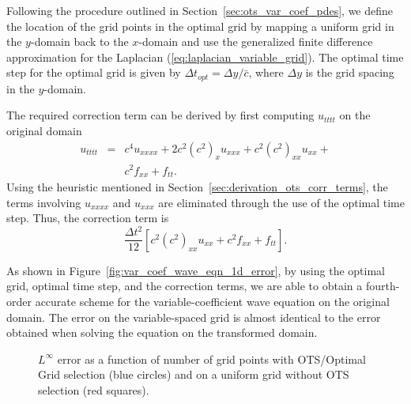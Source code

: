\documentclass[twocolumn]{article} %
\newcommand{\beq}{\begin{equation}}
\newcommand{\eeq}{\end{equation}}
\newcommand{\bea}{\begin{eqnarray}}
\newcommand{\eea}{\end{eqnarray}}
\def\cbar{\bar{c}}
\def\dt{\Delta t}
\def\dy{\Delta y}
\begin{document}
Following the procedure outlined in Section~\ref{sec:ots_var_coef_pdes}, we 
define the location of the grid points in the optimal grid by mapping
a uniform grid in the $y$-domain back to the $x$-domain and use 
the generalized finite difference approximation for the Laplacian 
(\ref{eq:laplacian_variable_grid}).  The optimal time step for the optimal
grid is given by $\dt_{opt} = \dy/\cbar$, where $\dy$ is the grid spacing 
in the $y$-domain.

The required correction term can be derived by first computing $u_{tttt}$ on 
the original domain
\bea
  u_{tttt} & = & 
    c^4 u_{xxxx} + 2 c^2 (c^2)_x u_{xxx} 
    + c^2 (c^2)_{xx} u_{xx} + \nonumber \\ 
& & c^2 f_{xx} + f_{tt}.
\eea
Using the heuristic mentioned in Section~\ref{sec:derivation_ots_corr_terms},
the terms involving $u_{xxxx}$ and $u_{xxx}$ are eliminated through the use 
of the optimal time step.  Thus, the correction term is
\beq
  \frac{\dt^2}{12} \left[ c^2 (c^2)_{xx} u_{xx} + c^2 f_{xx} + f_{tt} \right].
\eeq

As shown in Figure~\ref{fig:var_coef_wave_eqn_1d_error}, by using the optimal 
grid, optimal time step, and the correction terms, we are able to obtain a 
fourth-order accurate scheme for the variable-coefficient wave equation on
the original domain.  The error on the variable-spaced grid is almost 
identical to the error obtained when solving the equation on the transformed 
domain. 


\begin{figure}[thb]
\begin{center}
\caption{$L^\infty$ error as a function of number of grid points with 
OTS/Optimal Grid selection (blue circles) and on a uniform grid without 
OTS selection (red squares).
}
\label{fig:var_coef_diffusion_eqn_1d_error}
\end{center}
\end{figure}
\end{document}
